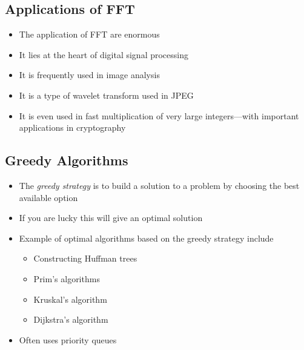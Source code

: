 
\begin{slide}
\section{Applications of FFT}

\begin{PauseHighLight}
  \begin{itemize}
  \item The application of FFT are enormous\pause
  \item It lies at the heart of digital signal processing\pause
  \item It is frequently used in image analysis\pause
  \item It is a type of wavelet transform used in JPEG\pause
  \item It is even used in fast multiplication of very large
    integers---with important applications in cryptography\pause
  \end{itemize}
\end{PauseHighLight}

\end{slide}


\begin{slide}
\section[-1]{Greedy Algorithms}

\begin{PauseHighLight}
  \begin{itemize}
  \item The \emph{greedy strategy} is to build a solution to a problem by
    choosing the best available option\pause
  \item If you are lucky this will give an optimal solution\pause
  \item Example of optimal algorithms based on the greedy strategy
    include
    \begin{itemize}\squeeze
    \item Constructing Huffman trees
    \item Prim's algorithms
    \item Kruskal's algorithm
    \item Dijkstra's algorithm\pause
    \end{itemize}
  \item Often uses priority queues\pause
  \end{itemize}
\end{PauseHighLight}

\end{slide}

